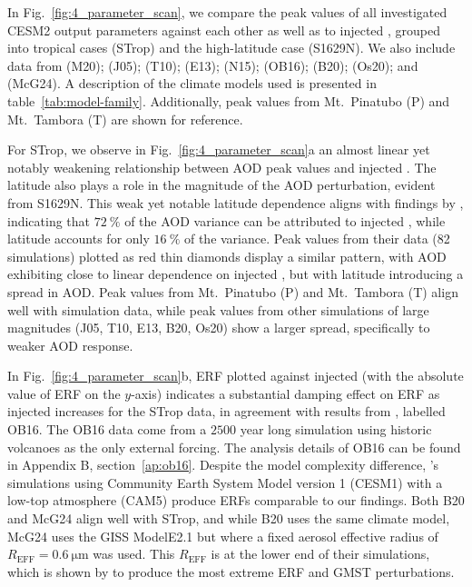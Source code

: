 \documentclass[draft]{agujournal2019}
\begin{document}
  In Fig.~\ref{fig:4_parameter_scan}, we compare the peak values of all investigated
  CESM2 output parameters against each other as well as to injected , grouped
  into tropical cases (STrop) and the high-latitude case (S1629N). We also include data
  from  (M20);  (J05);  (T10);
   (E13);  (N15); 
  (OB16);  (B20);  (Os20); and 
  (McG24). A description of the climate models used is presented in
  table~\ref{tab:model-family}. Additionally, peak values from Mt.\ Pinatubo (P) and
  Mt.\ Tambora (T) are shown for reference.

  For STrop, we observe in Fig.~\ref{fig:4_parameter_scan}a an almost linear yet notably
  weakening relationship between AOD peak values and injected . The latitude
  also plays a role in the magnitude of the AOD perturbation, evident from S1629N. This
  weak yet notable latitude dependence aligns with findings by ,
  indicating that \(\SI{72}{\percent}\) of the AOD variance can be attributed to
  injected , while latitude accounts for only \(\SI{16}{\percent}\) of the
  variance. Peak values from their data (82 simulations) plotted as red thin diamonds
  display a similar pattern, with AOD exhibiting close to linear dependence on injected
  , but with latitude introducing a spread in AOD. Peak values from
  Mt.\ Pinatubo (P) and Mt.\ Tambora (T) align well with simulation data, while peak
  values from other simulations of large  magnitudes (J05, T10, E13, B20, Os20)
  show a larger spread, specifically to weaker AOD response.

  In Fig.~\ref{fig:4_parameter_scan}b, ERF plotted against injected  (with the
  absolute value of ERF on the \(y\)-axis) indicates a substantial damping effect on ERF
  as injected  increases for the STrop data, in agreement with results from
  , labelled OB16. The OB16 data come from a \(2500\) year long
  simulation using historic volcanoes as the only external forcing. The analysis details
  of OB16 can be found in Appendix B, section~\ref{ap:ob16}. Despite the model
  complexity difference, 's simulations using Community Earth
  System Model version 1 (CESM1) with a low-top atmosphere (CAM5) produce ERFs
  comparable to our findings. Both B20 and McG24 align well with STrop, and while B20
  uses the same climate model, McG24 uses the GISS ModelE2.1 but where a fixed aerosol
  effective radius of \(R_{\text{EFF}}=\SI{0.6}{\micro\meter}\) was used. This
  \(R_{\text{EFF}}\) is at the lower end of their simulations, which is shown by
   to produce the most extreme ERF and GMST perturbations.
\end{document}
